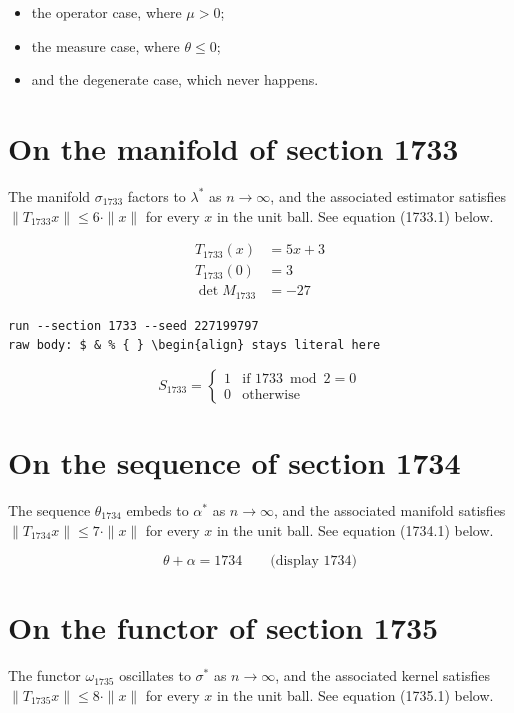 \documentclass{article}
\begin{document}
\begin{itemize}
  \item the operator case, where $\mu > 0$;
  \item the measure case, where $\theta \leq 0$;
  \item and the degenerate case, which never happens.
\end{itemize}

\section{On the manifold of section 1733}
The manifold $\sigma_{1733}$ factors to $\lambda^{*}$ as $n \to \infty$,
and the associated estimator satisfies $\|T_{1733} x\| \leq 6 \cdot \|x\|$
for every $x$ in the unit ball. See equation (1733.1) below.

\begin{align}
T_{1733}(x) &= 5 x + 3 \\
T_{1733}(0) &= 3 \\
\det M_{1733} &= -27
\end{align}

\begin{verbatim}
run --section 1733 --seed 227199797
raw body: $ & % { } \begin{align} stays literal here
\end{verbatim}

\begin{equation}
S_{1733} = \begin{cases} 1 & \text{if } 1733 \bmod 2 = 0 \\ 0 & \text{otherwise} \end{cases}
\end{equation}

\section{On the sequence of section 1734}
The sequence $\theta_{1734}$ embeds to $\alpha^{*}$ as $n \to \infty$,
and the associated manifold satisfies $\|T_{1734} x\| \leq 7 \cdot \|x\|$
for every $x$ in the unit ball. See equation (1734.1) below.

$$
\theta + \alpha = 1734 \qquad \text{(display 1734)}
$$

\section{On the functor of section 1735}
The functor $\omega_{1735}$ oscillates to $\sigma^{*}$ as $n \to \infty$,
and the associated kernel satisfies $\|T_{1735} x\| \leq 8 \cdot \|x\|$
for every $x$ in the unit ball. See equation (1735.1) below.
\end{document}
